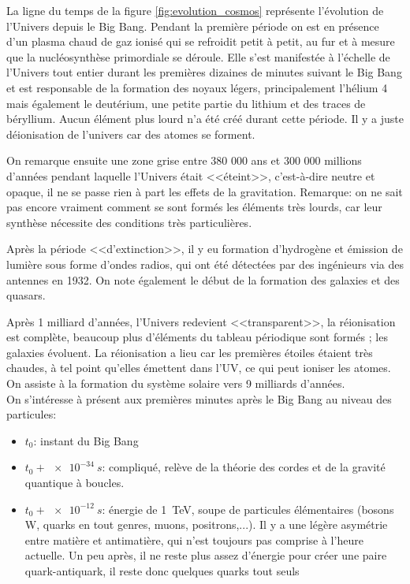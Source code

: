 La ligne du temps de la figure \ref{fig:evolution_cosmos} représente l'évolution de l'Univers depuis le Big Bang. Pendant la première période on est en présence d'un plasma chaud de gaz ionisé qui se refroidit petit à petit, au fur et à mesure que la nucléosynthèse primordiale se déroule. Elle s'est manifestée à l'échelle de l'Univers tout entier durant les premières dizaines de minutes suivant le Big Bang et est responsable de la formation des noyaux légers, principalement l'hélium 4 mais également le deutérium, une petite partie du lithium et des traces de béryllium. Aucun élément plus lourd n'a été créé durant cette période. Il y a juste déionisation de l'univers car des atomes se forment.

On remarque ensuite une zone grise entre 380 000 ans et 300 000 millions d'années pendant laquelle l'Univers était <<éteint>>, c'est-à-dire neutre et opaque, il ne se passe rien à part les effets de la gravitation. Remarque: on ne sait pas encore vraiment comment se sont formés les éléments très lourds, car leur synthèse nécessite des conditions très particulières.

Après la période <<d'extinction>>, il y eu formation d'hydrogène et émission de lumière sous forme d'ondes radios, qui ont été détectées par des ingénieurs via des antennes en 1932. On note également le début de la formation des galaxies et des quasars.

Après 1 milliard d'années, l'Univers redevient <<transparent>>, la réionisation est complète,  beaucoup plus d'éléments du tableau périodique sont formés ; les galaxies évoluent. La réionisation a lieu car les premières étoiles étaient très chaudes, à tel point qu'elles émettent dans l'UV, ce qui peut ioniser les atomes. On assiste à la formation du système solaire vers 9 milliards d'années.\\

On s'intéresse à présent aux premières minutes après le Big Bang au niveau des particules:
\begin{itemize}
    \item $t_0$: instant du Big Bang
    \item $t_0 + \SI{e-34}{s}$: compliqué, relève de la théorie des cordes et de la gravité quantique à boucles.
    \item $t_0 + \SI{e-12}{s}$: énergie de \SI{1}{TeV}, soupe de particules élémentaires (bosons W, quarks en tout genres, muons, positrons,...). Il y a une légère asymétrie entre matière et antimatière, qui n'est toujours pas comprise à l'heure actuelle. Un peu après, il ne reste plus assez d'énergie pour créer une paire quark-antiquark, il reste donc quelques quarks tout seuls
\end{itemize}

